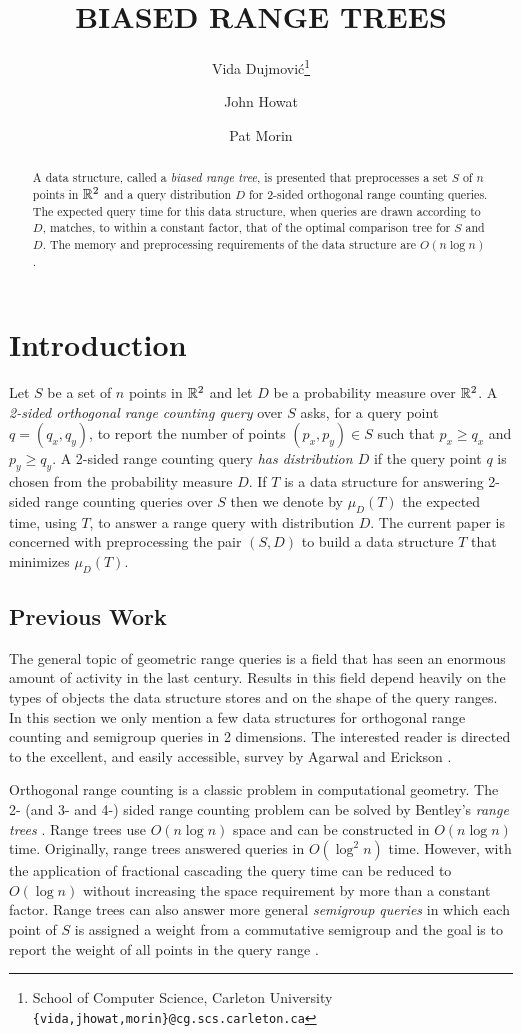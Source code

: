 \documentclass[charterfonts]{patmorin}
\title{\MakeUppercase{Biased Range Trees}}
\author{Vida Dujmovi\'c\thanks{School of Computer Science,
	Carleton University
\texttt{\{vida,jhowat,morin\}@cg.scs.carleton.ca}}
	\and John Howat\footnotemark[1]
	\and Pat Morin\footnotemark[1]}
\date{}
\begin{document}
\maketitle
\begin{abstract}
A data structure, called a \emph{biased range tree}, is presented that
preprocesses a set $S$ of $n$ points in $\mathbb{R}^2$ and a query
distribution $D$ for 2-sided orthogonal range counting queries.  The
expected query time for this data structure, when queries are drawn
according to $D$, matches, to within a constant factor, that of the
optimal comparison tree for $S$ and $D$.   The memory and preprocessing
requirements of the data structure are $O(n\log n)$.
\end{abstract}

\section{Introduction}

Let $S$ be a set of $n$ points in $\mathbb{R}^2$ and let $D$ be a probability
measure over $\mathbb{R}^2$.  A \emph{2-sided orthogonal range counting query}
over $S$ asks, for a query point $q=(q_x,q_y)$, to report the number
of points $(p_x,p_y)\in S$ such that $p_x \ge q_x$ and $p_y \ge q_y$.
A 2-sided range counting query \emph{has distribution $D$} if the
query point $q$ is chosen from the probability measure $D$.  If $T$ is
a data structure for answering 2-sided range counting queries over $S$
then we denote by $\mu_D(T)$ the expected time, using $T$, to answer a
range query with distribution $D$.  The current paper is concerned
with preprocessing the pair $(S,D)$ to build a data structure $T$ that
minimizes $\mu_D(T)$.

\subsection{Previous Work}

The general topic of geometric range queries is a field that has seen
an enormous amount of activity in the last century.  Results in this
field depend heavily on the types of objects the data structure stores
and on the shape of the query ranges.  In this section we only mention
a few data structures for orthogonal range counting and semigroup
queries in 2 dimensions.  The interested reader is directed to the
excellent, and easily accessible, survey by Agarwal and Erickson
\cite{ea99}.

Orthogonal range counting is a classic problem in computational
geometry.  The 2- (and 3- and 4-) sided range counting problem can be
solved by Bentley's \emph{range trees} \cite{ae42}.  Range trees use
$O(n\log n)$ space and can be constructed in $O(n\log n)$ time.
Originally, range trees answered queries in $O(\log^2 n)$ time.
However, with the application of fractional cascading
\cite{ae76,ae196} the query time can be reduced to $O(\log n)$ without
increasing the space requirement by more than a constant factor.
Range trees can also answer more general \emph{semigroup queries} in
which each point of $S$ is assigned a weight from a commutative
semigroup and the goal is to report the weight of all points in the
query range \cite{ae133,ae292}.
\end{document}
